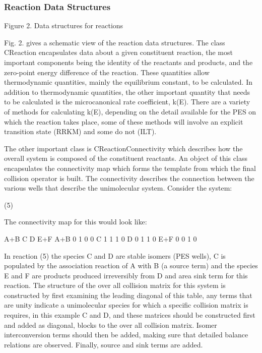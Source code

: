 \subsubsection{Reaction Data Structures
}\label{sec:ReactionDataStructures
}

 

Figure 2. Data structures for reactions

Fig. 2. gives a schematic view of the reaction data structures. The class CReaction encapsulates data about a given constituent reaction, the most important components being the identity of the reactants and products, and the zero-point energy difference of the reaction. These quantities allow thermodynamic quantities, mainly the equilibrium constant, to be calculated. In addition to thermodynamic quantities, the other important quantity that needs to be calculated is the microcanonical rate coefficient, k(E). There are a variety of methods for calculating k(E), depending on the detail available for the PES on which the reaction takes place, some of these methods will involve an explicit transition state (RRKM) and some do not (ILT).

The other important class is CReactionConnectivity which describes how the overall system is composed of the constituent reactants. An object of this class encapsulates the connectivity map which forms the template from which the final collision operator is built. The connectivity describes the connection between the various wells that describe the unimolecular system. Consider the system:

 	(5)

The connectivity map for this would look like:

	A+B	C	D	E+F
A+B	0	1	0	0
C	1	1	1	0
D	0	1	1	0
E+F	0	0	1	0

In reaction (5) the species C and D are stable isomers (PES wells), C is populated by the association reaction of A with B (a source term) and the species E and F are products produced irreversibly from D and area sink term for this reaction. The structure of the over all collision matrix for this system is constructed by first examining the leading diagonal of this table, any terms that are unity indicate a unimolecular species for which a specific collision matrix is requires, in this example C and D, and these matrices should be constructed first and added as diagonal, blocks to the over all collision matrix. Isomer interconversion terms should then be added, making sure that detailed balance relations are observed. Finally, source and sink terms are added.

